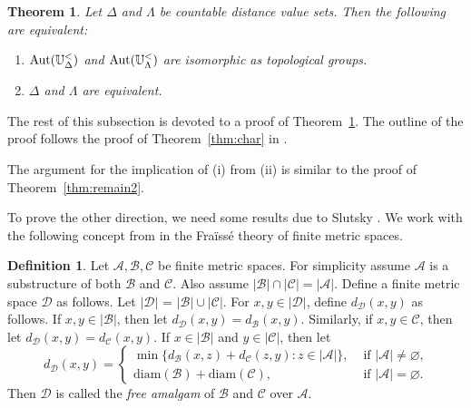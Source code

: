 \documentclass[10pt,a4paper]{amsart}
\newtheorem{theorem}{Theorem}[section]
\theoremstyle{definition}
\newtheorem{definition}{Definition}[section]
\theoremstyle{remark}
\begin{document}
    \begin{theorem}\label{thm:class}
        Let $\Delta$ and $\Lambda$ be countable distance value sets. Then the following are equivalent: 
        \begin{enumerate}
            \item[\rm (i)] ${\rm Aut}(\mathbb{U}_\Delta^<)$ and ${\rm Aut}(\mathbb{U}_\Lambda^<)$ are isomorphic as topological groups. 
            \item[\rm (ii)] $\Delta$ and $\Lambda$ are equivalent. 
        \end{enumerate}
    \end{theorem}

The rest of this subsection is devoted to a proof of Theorem~\ref{thm:class}. The outline of the proof follows the proof of Theorem~\ref{thm:char} in \cite{EGLMM}. 


The argument for the implication of (i) from (ii) is similar to the proof of Theorem~\ref{thm:remain2}. 

To prove the other direction, we need some results due to Slutsky \cite{Slutsky}. We work with the following concept from \cite{Slutsky} in the Fra\"iss\'e theory of finite metric spaces. 

\begin{definition} Let $\mathcal{A}, \mathcal{B}, \mathcal{C}$ be finite metric spaces.  For simplicity assume $\mathcal{A}$ is a substructure of both $\mathcal{B}$ and $\mathcal{C}$. Also assume $|\mathcal{B}|\cap |\mathcal{C}|=|\mathcal{A}|$. Define a finite metric space $\mathcal{D}$ as follows. Let $|\mathcal{D}|$ = $|\mathcal{B}| \cup |\mathcal{C}|$. For $x,y\in |\mathcal{D}|$, define $d_{\mathcal{D}}(x,y)$ as follows. If $x,y \in |\mathcal{B}|$, then let $d_{\mathcal{D}}(x,y)=d_{\mathcal{B}}(x,y)$. Similarly, if $x,y\in \mathcal{C}$, then let $d_{\mathcal{D}}(x,y)=d_{\mathcal{C}}(x,y)$. If $x\in |\mathcal{B}|$ and $y\in |\mathcal{C}|$, then let
    \begin{equation*}
        d_{\mathcal{D}}(x,y)= \left \{
            \begin{array}{ll}
                \min\{d_\mathcal{B}(x,z)+d_\mathcal{C}(z,y)\colon  z\in |\mathcal{A}|\}, & \mbox{ if $|\mathcal{A}| \neq \varnothing$,} \\
                \mbox{diam}(\mathcal{B})+\mbox{diam}(\mathcal{C}),  & \mbox{ if $|\mathcal{A}| = \varnothing$.}
            \end{array}\right .
    \end{equation*}
Then $\mathcal{D}$ is called the {\em free amalgam} of $\mathcal{B}$ and $\mathcal{C}$ over $\mathcal{A}$.
\end{definition}
\end{document}
